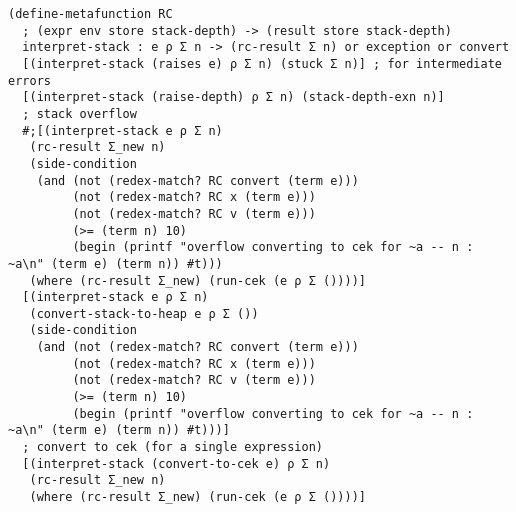 \begin{lstlisting}[language=pltredex,
                basicstyle=\ttfamily\scriptsize,
                numbers=none, xleftmargin=2em]
(define-metafunction RC
  ; (expr env store stack-depth) -> (result store stack-depth)
  interpret-stack : e ρ Σ n -> (rc-result Σ n) or exception or convert
  [(interpret-stack (raises e) ρ Σ n) (stuck Σ n)] ; for intermediate errors
  [(interpret-stack (raise-depth) ρ Σ n) (stack-depth-exn n)]
  ; stack overflow
  #;[(interpret-stack e ρ Σ n)
   (rc-result Σ_new n)
   (side-condition
    (and (not (redex-match? RC convert (term e)))
         (not (redex-match? RC x (term e)))
         (not (redex-match? RC v (term e)))
         (>= (term n) 10)
         (begin (printf "overflow converting to cek for ~a -- n : ~a\n" (term e) (term n)) #t)))
   (where (rc-result Σ_new) (run-cek (e ρ Σ ())))]
  [(interpret-stack e ρ Σ n)
   (convert-stack-to-heap e ρ Σ ())
   (side-condition
    (and (not (redex-match? RC convert (term e)))
         (not (redex-match? RC x (term e)))
         (not (redex-match? RC v (term e)))
         (>= (term n) 10)
         (begin (printf "overflow converting to cek for ~a -- n : ~a\n" (term e) (term n)) #t)))]
  ; convert to cek (for a single expression)
  [(interpret-stack (convert-to-cek e) ρ Σ n)
   (rc-result Σ_new n)
   (where (rc-result Σ_new) (run-cek (e ρ Σ ())))]


\end{lstlisting}
